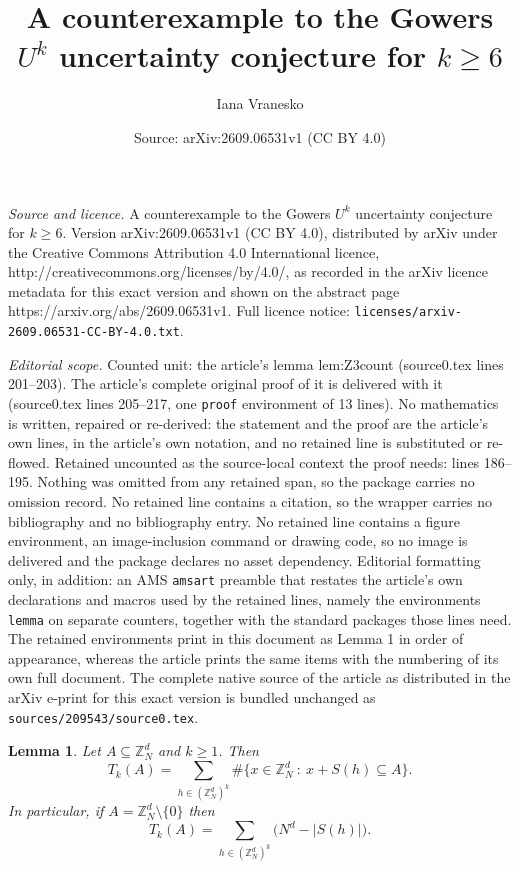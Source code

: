\documentclass[10pt,a4paper]{amsart}
\title{A counterexample to the Gowers $U^k$ uncertainty conjecture for $k\ge 6$}
\author{Iana Vranesko}
\date{Source: arXiv:2609.06531v1 (CC BY 4.0)}
\newtheorem{lemma}{Lemma}
\newcommand{\Z}{\mathbb{Z}}
\begin{document}
\maketitle

\noindent\emph{Source and licence.} A counterexample to the Gowers $U^k$ uncertainty conjecture for $k\ge 6$. Version arXiv:2609.06531v1 (CC BY 4.0), distributed by arXiv under the Creative Commons Attribution 4.0 International licence, http://creativecommons.org/licenses/by/4.0/, as recorded in the arXiv licence metadata for this exact version and shown on the abstract page https://arxiv.org/abs/2609.06531v1. Full licence notice: \texttt{licenses/arxiv-2609.06531-CC-BY-4.0.txt}.\par\smallskip

\noindent\textit{Editorial scope.} Counted unit: the article's lemma lem:Z3count (source0.tex lines 201--203). The article's complete original proof of it is delivered with it (source0.tex lines 205--217, one \texttt{proof} environment of 13 lines). No mathematics is written, repaired or re-derived: the statement and the proof are the article's own lines, in the article's own notation, and no retained line is substituted or re-flowed.  Retained uncounted as the source-local context the proof needs: lines 186--195.  Nothing was omitted from any retained span, so the package carries no omission record.  No retained line contains a citation, so the wrapper carries no bibliography and no bibliography entry.  No retained line contains a figure environment, an image-inclusion command or drawing code, so no image is delivered and the package declares no asset dependency.  Editorial formatting only, in addition: an AMS \texttt{amsart} preamble that restates the article's own declarations and macros used by the retained lines, namely the environments \texttt{lemma} on separate counters, together with the standard packages those lines need.  The retained environments print in this document as Lemma 1 in order of appearance, whereas the article prints the same items with the numbering of its own full document.  The complete native source of the article as distributed in the arXiv e-print for this exact version is bundled unchanged as \texttt{sources/209543/source0.tex}.
\begin{lemma}\label{lem:subsetsums}
Let $A\subseteq\Z_N^d$ and $k\ge1$. Then
\[
T_k(A)=\sum_{h\in(\Z_N^d)^k}\#\bigl\{x\in\Z_N^d\ :\ x+S(h)\subseteq A\bigr\}.
\]
In particular, if $A=\Z_N^d\setminus\{0\}$ then
\[
T_k(A)=\sum_{h\in(\Z_N^d)^k}\bigl(N^d-|S(h)|\bigr).
\]
\end{lemma}
\end{document}
